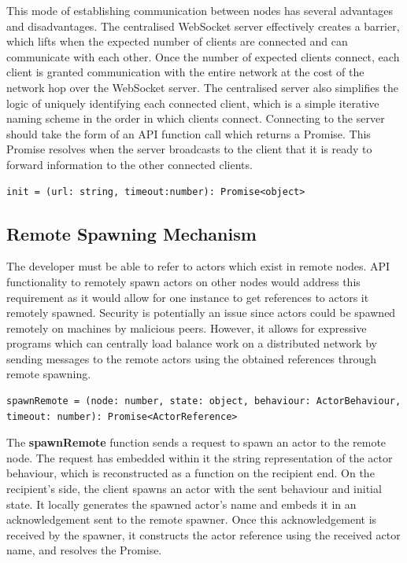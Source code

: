 \documentclass[oneside]{um-fict}
\begin{document}
This mode of establishing communication between nodes has several advantages and disadvantages. The centralised WebSocket server effectively creates a barrier, which lifts when the expected number of clients are connected and can communicate with each other. Once the number of expected clients connect, each client is granted communication with the entire network at the cost of the network hop over the WebSocket server. The centralised server also simplifies the logic of uniquely identifying each connected client, which is a simple iterative naming scheme in the order in which clients connect. Connecting to the server should take the form of an API function call which returns a Promise. This Promise resolves when the server broadcasts to the client that it is ready to forward information to the other connected clients.
\begin{lstlisting}
init = (url: string, timeout:number): Promise<object>
\end{lstlisting}

\subsection{Remote Spawning Mechanism}
The developer must be able to refer to actors which exist in remote nodes. API functionality to remotely spawn actors on other nodes would address this requirement as it would allow for one instance to get references to actors it remotely spawned. Security is potentially an issue since actors could be spawned remotely on machines by malicious peers. However, it allows for expressive programs which can centrally load balance work on a distributed network by sending messages to the remote actors using the obtained references through remote spawning.
\begin{lstlisting}
spawnRemote = (node: number, state: object, behaviour: ActorBehaviour, timeout: number): Promise<ActorReference>
\end{lstlisting}

The \textbf{spawnRemote} function sends a request to spawn an actor to the remote node. The request has embedded within it the string representation of the actor behaviour, which is reconstructed as a function on the recipient end. On the recipient's side, the client spawns an actor with the sent behaviour and initial state. It locally generates the spawned actor's name and embeds it in an acknowledgement sent to the remote spawner. Once this acknowledgement is received by the spawner, it constructs the actor reference using the received actor name, and resolves the Promise.
\end{document}
